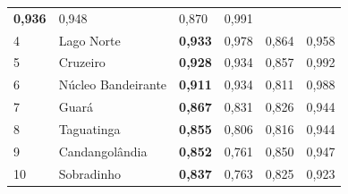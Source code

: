 \begin{table}[]
{\begin{tabular}{llllll}
            {\color[HTML]{202122} \textbf{0,936}} &
            {\color[HTML]{202122} 0,948} &
            {\color[HTML]{202122} 0,870} &
            {\color[HTML]{202122} 0,991} \\
            \rowcolor[HTML]{F8F9FA}
            {\color[HTML]{202122} 4} &
            {\color[HTML]{202122} Lago Norte} &
            {\color[HTML]{202122} \textbf{0,933}} &
            {\color[HTML]{202122} 0,978} &
            {\color[HTML]{202122} 0,864} &
            {\color[HTML]{202122} 0,958} \\
            \rowcolor[HTML]{F8F9FA}
            {\color[HTML]{202122} 5} &
            {\color[HTML]{202122} Cruzeiro} &
            {\color[HTML]{202122} \textbf{0,928}} &
            {\color[HTML]{202122} 0,934} &
            {\color[HTML]{202122} 0,857} &
            {\color[HTML]{202122} 0,992} \\
            \rowcolor[HTML]{F8F9FA}
            {\color[HTML]{202122} 6} &
            {\color[HTML]{202122} Núcleo Bandeirante} &
            {\color[HTML]{202122} \textbf{0,911}} &
            {\color[HTML]{202122} 0,934} &
            {\color[HTML]{202122} 0,811} &
            {\color[HTML]{202122} 0,988} \\
            \rowcolor[HTML]{F8F9FA}
            {\color[HTML]{202122} 7} &
            {\color[HTML]{202122} Guará} &
            {\color[HTML]{202122} \textbf{0,867}} &
            {\color[HTML]{202122} 0,831} &
            {\color[HTML]{202122} 0,826} &
            {\color[HTML]{202122} 0,944} \\
            \rowcolor[HTML]{F8F9FA}
            {\color[HTML]{202122} 8} &
            {\color[HTML]{202122} Taguatinga} &
            {\color[HTML]{202122} \textbf{0,855}} &
            {\color[HTML]{202122} 0,806} &
            {\color[HTML]{202122} 0,816} &
            {\color[HTML]{202122} 0,944} \\
            \rowcolor[HTML]{F8F9FA}
            {\color[HTML]{202122} 9} &
            {\color[HTML]{202122} Candangolândia} &
            {\color[HTML]{202122} \textbf{0,852}} &
            {\color[HTML]{202122} 0,761} &
            {\color[HTML]{202122} 0,850} &
            {\color[HTML]{202122} 0,947} \\
            \rowcolor[HTML]{F8F9FA}
            {\color[HTML]{202122} 10} &
            {\color[HTML]{202122} Sobradinho} &
            {\color[HTML]{202122} \textbf{0,837}} &
            {\color[HTML]{202122} 0,763} &
            {\color[HTML]{202122} 0,825} &
            {\color[HTML]{202122} 0,923} \\

\end{tabular}}
\end{table}
